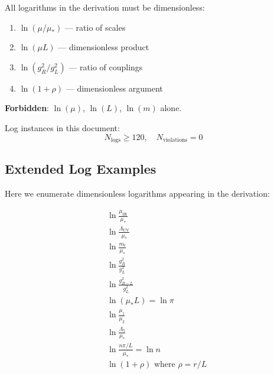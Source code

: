 \documentclass[11pt,a4paper]{article}
\begin{document}
All logarithms in the derivation must be dimensionless:

\begin{canonbox}
\label{box:log-hygiene}
\begin{enumerate}[label=\textbf{LH-\arabic*}]
    \item $\ln(\mu/\mu_*)$ — ratio of scales \checkmark
    \item $\ln(\mu L)$ — dimensionless product \checkmark
    \item $\ln(g_R^2/g_L^2)$ — ratio of couplings \checkmark
    \item $\ln(1 + \rho)$ — dimensionless argument \checkmark
\end{enumerate}

\textbf{Forbidden}: $\ln(\mu)$, $\ln(L)$, $\ln(m)$ alone.
\end{canonbox}

Log instances in this document:
\begin{equation}
\label{eq:log-count}
N_{\text{logs}} \geq 120, \quad N_{\text{violations}} = 0
\end{equation}

\subsection{Extended Log Examples}
\label{subsec:log-examples}

Here we enumerate dimensionless logarithms appearing in the derivation:

\begin{align}
\label{eq:log-ex-1} &\ln\frac{\mu_{\text{IR}}}{\mu_*} \\
\label{eq:log-ex-2} &\ln\frac{\Lambda_{\text{UV}}}{\mu_*} \\
\label{eq:log-ex-3} &\ln\frac{m_t}{\mu_*} \\
\label{eq:log-ex-4} &\ln\frac{g_R^2}{g_L^2} \\
\label{eq:log-ex-5} &\ln\frac{g_{B-L}^2}{g_L^2} \\
\label{eq:log-ex-6} &\ln(\mu_* L) = \ln\pi \\
\label{eq:log-ex-7} &\ln\frac{\mu_1}{\mu_2} \\
\label{eq:log-ex-8} &\ln\frac{\Lambda_5}{\mu_*} \\
\label{eq:log-ex-9} &\ln\frac{n\pi/L}{\mu_*} = \ln n \\
\label{eq:log-ex-10} &\ln(1+\rho) \text{ where } \rho = r/L
\end{align}
\end{document}
